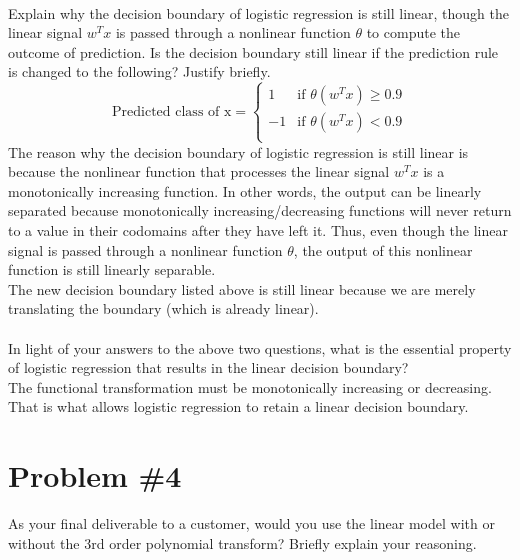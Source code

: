 \documentclass[12pt]{article}
\begin{document}
	\\ 
	Explain why the decision boundary of logistic regression is still linear, though the linear signal $w^Tx$ is passed through a nonlinear function $\theta$ to compute the outcome of prediction.
	Is the decision boundary still linear if the prediction rule is changed to the following? Justify briefly.
	\begin{equation*}
	\text{Predicted class of x} = 
	\begin{cases}
	1 & \text{if } \theta(w^Tx) \ge 0.9 \\
	-1 & \text{if } \theta(w^Tx) < 0.9 \\
	\end{cases}
	\end{equation*}
	The reason why the decision boundary of logistic regression is still linear is because the nonlinear function that processes the linear signal $w^T x$ is a monotonically increasing function. In other words, the output can be linearly separated because monotonically increasing/decreasing functions will never return to a value in their codomains after they have left it. Thus, even though the linear signal is passed through a nonlinear function $\theta$, the output of this nonlinear function is still linearly separable. \\
	The new decision boundary listed above is still linear because we are merely translating the boundary (which is already linear).
	\\ \\
	In light of your answers to the above two questions, what is the essential property of logistic regression that results in the linear decision boundary? \\
	The functional transformation must be monotonically increasing or decreasing. That is what allows logistic regression to retain a linear decision boundary.
	
	
	
	
	\section*{Problem \#4}
	As your final deliverable to a customer, would you use the linear model with or without the 3rd order polynomial transform? Briefly explain your reasoning.
	
\end{document}
